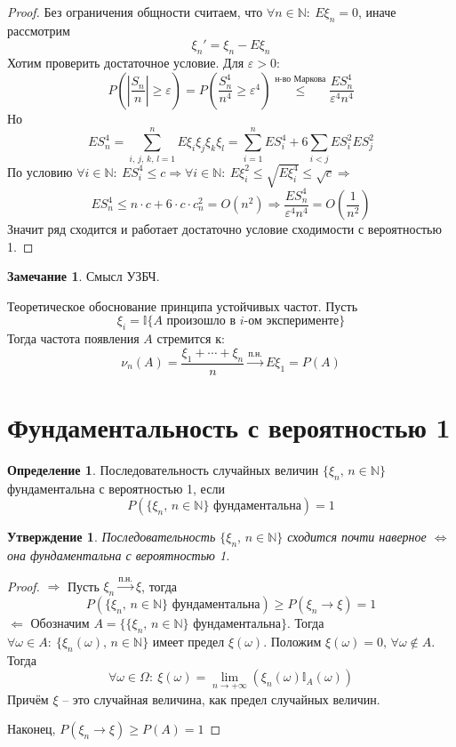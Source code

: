 \documentclass[a4paper,12pt]{article}
\renewcommand{\leq}{\ensuremath{\leqslant}}
\renewcommand{\geq}{\ensuremath{\geqslant}}
\theoremstyle{plain}
\newtheorem{proposition}{Утверждение}[section]
\theoremstyle{definition}
\newtheorem{definition}{Определение}[section]
\newtheorem*{note}{Замечание}
\theoremstyle{remark}
\begin{document}
\begin{proof}
  Без ограничения общности считаем, что $\forall n \in \mathbb{N}:\: E\xi_n = 0$, иначе рассмотрим
  \[\xi_n' = \xi_n - E\xi_n\]
  Хотим проверить достаточное условие. Для $\varepsilon > 0$:
  \[P\left(\left|\frac{S_n}{n}\right| \geq \varepsilon\right) = P\left(\frac{S_n^4}{n^4} \geq \varepsilon ^4\right) \stackrel{\text{н-во Маркова}}{\leq} \frac{ES_n^4}{\varepsilon^4n^4}\]
  Но 
  \[ES_n^4 = \sum_{i,\,j,\,k,\,l = 1}^n E\xi_i\xi_j\xi_k\xi_l = \sum_{i = 1}^n ES_i^4 + 6\sum_{i < j}ES_i^2ES_j^2\]
  По условию $\forall i \in \mathbb{N}:\: ES_i^4 \leq c \Rightarrow \forall i \in \mathbb{N}:\: E\xi_i^2 \leq \sqrt{E\xi_i^4} \leq \sqrt{c} \Rightarrow$
  \[ES_n^4 \leq n\cdot c + 6\cdot c\cdot c_n^2 = O(n^2) \Rightarrow \frac{ES_n^4}{\varepsilon^4n^4} = O\left(\frac{1}{n^2}\right)\]
  Значит ряд сходится и работает достаточно условие сходимости с вероятностью 1.
\end{proof}

\begin{note}
  Смысл УЗБЧ.

  Теоретическое обоснование принципа устойчивых частот. Пусть 
  \[\xi_i = \mathbb{I}\{A \text{ произошло в }i \text{-ом эксперименте}\}\]
  Тогда частота появления $A$ стремится к:
  \[\nu_n(A) = \frac{\xi_1 + \cdots + \xi_n}{n} \stackrel{\text{п.н.}}{\to} E\xi_1 = P(A)\]
\end{note}

\section{Фундаментальность с вероятностью 1}
\begin{definition}
	Последовательность случайных величин $\{\xi_n,\, n \in \mathbb{N}\}$ фундаментальна с вероятностью 1, если
	\[P(\{\xi_n,\, n \in \mathbb{N}\} \text{ фундаментальна}) = 1\]
\end{definition}

\begin{proposition}
	Последовательность $\{\xi_n,\, n \in \mathbb{N}\}$ сходится почти наверное $\Leftrightarrow$ она фундаментальна с вероятностью 1.
\end{proposition}

\begin{proof}
	$\Rightarrow$ Пусть $\xi_n \stackrel{\text{п.н.}}{\to} \xi$, тогда
	\[P(\{\xi_n,\, n \in \mathbb{N}\} \text{ фундаментальна}) \geq P(\xi_n \to \xi) = 1\]
	$\Leftarrow$ Обозначим $A = \{\{\xi_n,\, n \in \mathbb{N}\} \text{ фундаментальна}\}$. Тогда $\forall \omega \in A:\: \{\xi_n(\omega),\, n \in \mathbb{N}\}$ имеет предел $\xi(\omega)$. Положим $\xi(\omega) = 0,\, \forall \omega \not\in A$. Тогда
	\[\forall \omega \in \Omega:\: \xi(\omega) = \lim_{n \to +\infty}(\xi_n(\omega)\mathbb{I}_A(\omega))\]
	Причём $\xi$ -- это случайная величина, как предел случайных величин.

	Наконец, $P(\xi_n \to \xi) \geq P(A) = 1$
\end{proof}
\end{document}
